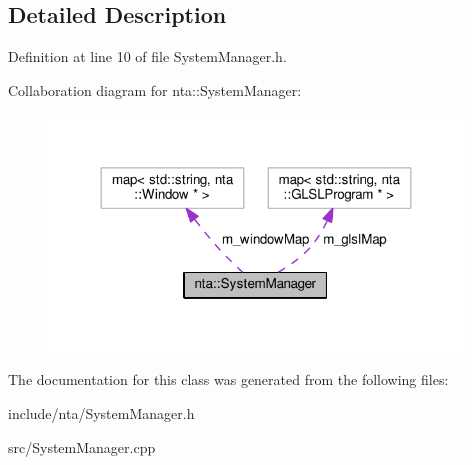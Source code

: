 \subsection{Detailed Description}


Definition at line 10 of file System\+Manager.\+h.



Collaboration diagram for nta\+:\+:System\+Manager\+:
\nopagebreak
\begin{figure}[H]
\begin{center}
\leavevmode
\includegraphics[width=312pt]{d5/d24/classnta_1_1SystemManager__coll__graph}
\end{center}
\end{figure}


The documentation for this class was generated from the following files\+:\begin{DoxyCompactItemize}
\item 
include/nta/System\+Manager.\+h\item 
src/System\+Manager.\+cpp\end{DoxyCompactItemize}
